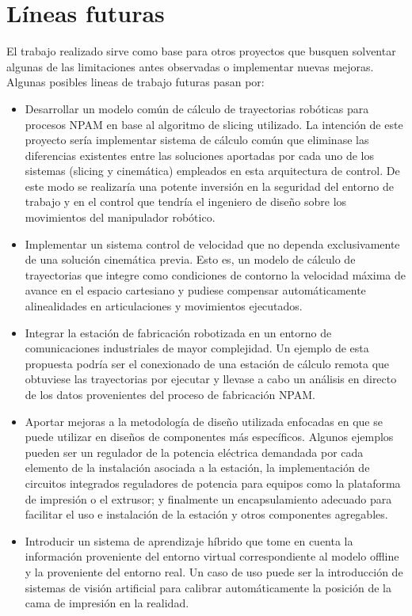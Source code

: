 \section{Líneas futuras}
El trabajo realizado sirve como base para otros proyectos que busquen solventar algunas de las limitaciones antes observadas o implementar nuevas mejoras. Algunas posibles lineas de trabajo futuras pasan por:

\begin{itemize}
    \item Desarrollar un modelo común de cálculo de trayectorias robóticas para procesos \acrshort{NPAM} en base al algoritmo de slicing utilizado. La intención de este proyecto sería implementar sistema de cálculo común que eliminase las diferencias existentes entre las soluciones aportadas por cada uno de los sistemas (slicing y cinemática) empleados en esta arquitectura de control. De este modo se realizaría una potente inversión en la seguridad del entorno de trabajo y en el control que tendría el ingeniero de diseño sobre los movimientos del manipulador robótico.

    \item Implementar un sistema control de velocidad que no dependa exclusivamente de una solución cinemática previa. Esto es, un modelo de cálculo de trayectorias que integre como condiciones de contorno la velocidad máxima de avance en el espacio cartesiano y pudiese compensar automáticamente alinealidades en articulaciones y movimientos ejecutados.

    \item Integrar la estación de fabricación robotizada en un entorno de comunicaciones industriales de mayor complejidad. Un ejemplo de esta propuesta podría ser el conexionado de una estación de cálculo remota que obtuviese las trayectorias por ejecutar y llevase a cabo un análisis en directo de los datos provenientes del proceso de fabricación \acrshort{NPAM}.

    \item Aportar mejoras a la metodología de diseño utilizada enfocadas en que se puede utilizar en diseños de componentes más específicos. Algunos ejemplos pueden ser un regulador de la potencia eléctrica demandada por cada elemento de la instalación asociada a la estación, la implementación de circuitos integrados reguladores de potencia para equipos como la plataforma de impresión o el extrusor; y finalmente un encapsulamiento adecuado para facilitar el uso e instalación de la estación y otros componentes agregables.

    \item Introducir un sistema de aprendizaje híbrido que tome en cuenta la información proveniente del entorno virtual correspondiente al modelo offline y la proveniente del entorno real. Un caso de uso puede ser la introducción de sistemas de visión artificial para calibrar automáticamente la posición de la cama de impresión en la realidad.
\end{itemize}

